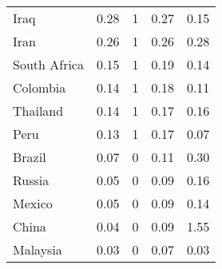 \begin{longtable}[t]{lrrrr}
Iraq & 0.28 & 1 & 0.27 & 0.15\\
Iran & 0.26 & 1 & 0.26 & 0.28\\
South Africa & 0.15 & 1 & 0.19 & 0.14\\
Colombia & 0.14 & 1 & 0.18 & 0.11\\
Thailand & 0.14 & 1 & 0.17 & 0.16\\
Peru & 0.13 & 1 & 0.17 & 0.07\\
Brazil & 0.07 & 0 & 0.11 & 0.30\\
Russia & 0.05 & 0 & 0.09 & 0.16\\
Mexico & 0.05 & 0 & 0.09 & 0.14\\
China & 0.04 & 0 & 0.09 & 1.55\\
Malaysia & 0.03 & 0 & 0.07 & 0.03\\
\bottomrule
\end{longtable}